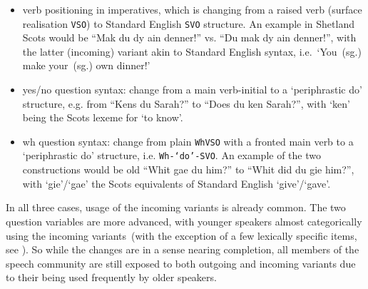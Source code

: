 \begin{itemize}
\item verb positioning in imperatives, which is changing from a raised verb (surface realisation \texttt{VSO}) to Standard English \texttt{SVO} structure. An example in Shetland Scots would be ``Mak du dy ain denner!'' vs. ``Du mak dy ain denner!'', with the latter (incoming) variant akin to Standard English syntax, i.e.~`You~(sg.) make your~(sg.) own dinner!'

\item yes/no question syntax: change from a main verb-initial to a `periphrastic do' structure, e.g. from ``Kens du Sarah?'' to ``Does du ken Sarah?'', with `ken' being the Scots lexeme for `to know'.

\item wh question syntax: change from plain \texttt{WhVSO} with a fronted main verb to a `periphrastic do' structure, i.e. \texttt{Wh-`do'-SVO}. An example of the two constructions would be old ``Whit gae du him?'' to ``Whit did du gie him?'', with `gie'/`gae' the Scots equivalents of Standard English `give'/`gave'.
\end{itemize}

In all three cases, usage of the incoming variants is already common. The two question variables are more advanced, with younger speakers almost categorically using the incoming variants~(with the exception of a few lexically specific items, see \citealt{Jamieson2015}).
So while the changes are in a sense nearing completion, all members of the speech community are still exposed to both outgoing and incoming variants due to their being used frequently by older speakers.

